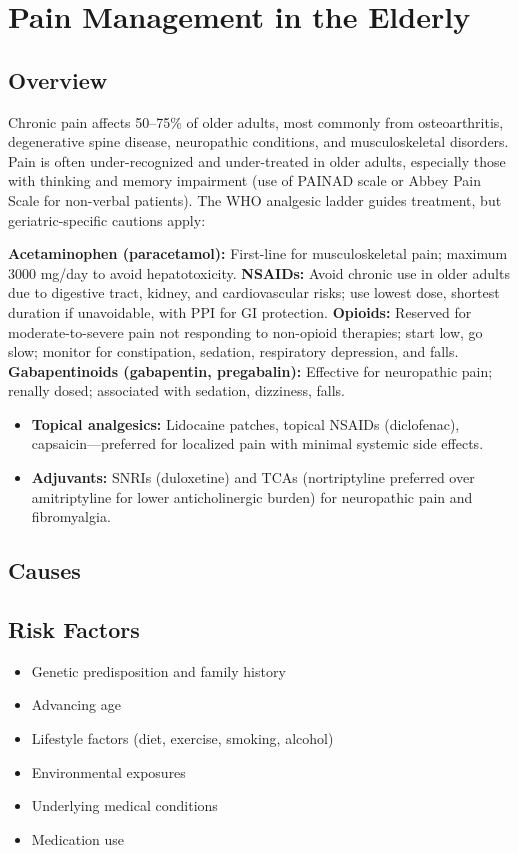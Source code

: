 \chapter{Pain Management in the Elderly}
\label{sec:Pain Management in the Elderly}

\section{Overview}
Chronic pain affects 50--75\% of older adults, most commonly from osteoarthritis, degenerative spine disease, neuropathic conditions, and musculoskeletal disorders. Pain is often under-recognized and under-treated in older adults, especially those with thinking and memory impairment (use of PAINAD scale or Abbey Pain Scale for non-verbal patients). The WHO analgesic ladder guides treatment, but geriatric-specific cautions apply:

\textbf{Acetaminophen (paracetamol):} First-line for musculoskeletal pain; maximum 3000 mg/day to avoid hepatotoxicity. \textbf{NSAIDs:} Avoid chronic use in older adults due to digestive tract, kidney, and cardiovascular risks; use lowest dose, shortest duration if unavoidable, with PPI for GI protection. \textbf{Opioids:} Reserved for moderate-to-severe pain not responding to non-opioid therapies; start low, go slow; monitor for constipation, sedation, respiratory depression, and falls. \textbf{Gabapentinoids (gabapentin, pregabalin):} Effective for neuropathic pain; renally dosed; associated with sedation, dizziness, falls.

\begin{itemize}[noitemsep]
  \item \textbf{Topical analgesics:} Lidocaine patches, topical NSAIDs (diclofenac), capsaicin---preferred for localized pain with minimal systemic side effects.
  \item \textbf{Adjuvants:} SNRIs (duloxetine) and TCAs (nortriptyline preferred over amitriptyline for lower anticholinergic burden) for neuropathic pain and fibromyalgia.
\end{itemize}
\section{Causes}
\section{Risk Factors}

\begin{itemize}[noitemsep]
  \item Genetic predisposition and family history
  \item Advancing age
  \item Lifestyle factors (diet, exercise, smoking, alcohol)
  \item Environmental exposures
  \item Underlying medical conditions
  \item Medication use
\end{itemize}
